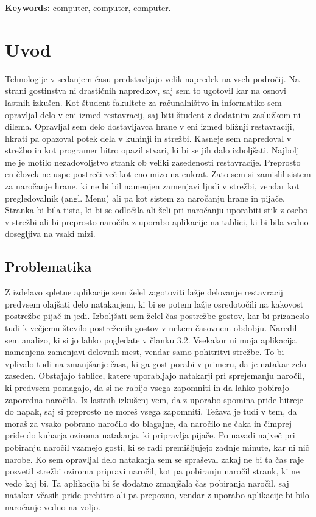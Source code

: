 \documentclass[a4paper, 12pt]{book}
\newcommand{\tkeywordsEn}{computer, computer, computer}
\newcommand{\clearemptydoublepage}{\newpage{\pagestyle{empty}\cleardoublepage}}
\begin{document}
\noindent\textbf{Keywords:} \tkeywordsEn.
\clearemptydoublepage

\mainmatter
\setcounter{page}{1}
\pagestyle{fancy}

\chapter{Uvod}
Tehnologije v sedanjem času predstavljajo velik napredek na vseh področij. Na strani gostinstva ni drastičnih napredkov, saj sem to ugotovil kar na osnovi lastnih izkušen. Kot študent fakultete za računalništvo in informatiko sem opravljal delo v eni izmed restavracij, saj biti študent z dodatnim zaslužkom ni dilema. Opravljal sem delo dostavljavca hrane v eni izmed bližnji restavraciji, hkrati pa opazoval potek dela v kuhinji in strežbi. Kasneje sem napredoval v strežbo in kot programer hitro opazil stvari, ki bi se jih dalo izboljšati. Najbolj me je motilo nezadovoljstvo strank ob veliki zasedenosti restavracije. Preprosto en človek ne uspe postreči več kot eno mizo na enkrat. Zato sem si zamislil sistem za naročanje hrane, ki ne bi bil namenjen zamenjavi ljudi v strežbi, vendar kot pregledovalnik (angl. Menu) ali pa kot sistem za naročanju hrane in pijače. Stranka bi bila tista, ki bi se odločila ali želi pri naročanju uporabiti stik z osebo v strežbi ali bi preprosto naročila z uporabo aplikacije na tablici, ki bi bila vedno dosegljiva na vsaki mizi. 
\section {Problematika}
Z izdelavo spletne aplikacije sem želel zagotoviti lažje delovanje restavracij predvsem olajšati delo natakarjem, ki bi se potem lažje osredotočili na kakovost postrežbe pijač in jedi. Izboljšati sem želel čas postrežbe gostov, kar bi prizaneslo tudi k večjemu število postreženih gostov v nekem časovnem obdobju. Naredil sem analizo, ki si jo lahko pogledate v članku 3.2. Vsekakor ni moja aplikacija namenjena zamenjavi delovnih mest, vendar samo pohitritvi strežbe. To bi vplivalo tudi na zmanjšanje časa, ki ga gost porabi v primeru, da je natakar zelo zaseden. Obstajajo tablice, katere uporabljajo natakarji pri sprejemanju naročil, ki predvsem pomagajo, da si ne rabijo vsega zapomniti in da lahko pobirajo zaporedna naročila. Iz lastnih izkušenj vem, da z uporabo spomina pride hitreje do napak, saj si preprosto ne moreš vsega zapomniti. Težava je tudi v tem, da moraš za vsako pobrano naročilo do blagajne, da naročilo ne čaka in čimprej pride do kuharja oziroma natakarja, ki pripravlja pijače. Po navadi največ pri pobiranju naročil vzamejo  gosti, ki se radi premišljujejo zadnje minute, kar ni nič narobe. Ko sem opravljal delo natakarja sem se spraševal zakaj ne bi ta čas raje posvetil strežbi oziroma pripravi naročil, kot pa pobiranju naročil strank, ki ne vedo kaj bi. Ta aplikacija bi še dodatno zmanjšala čas pobiranja naročil, saj natakar včasih pride prehitro ali pa prepozno, vendar z uporabo aplikacije bi bilo naročanje vedno na voljo. 
\end{document}
